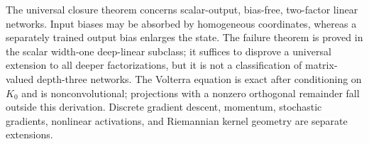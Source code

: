 The universal closure theorem concerns scalar-output, bias-free, two-factor linear networks.  Input biases may be absorbed by homogeneous coordinates, whereas a separately trained output bias enlarges the state.  The failure theorem is proved in the scalar width-one deep-linear subclass; it suffices to disprove a universal extension to all deeper factorizations, but it is not a classification of matrix-valued depth-three networks.  The Volterra equation is exact after conditioning on $K_0$ and is nonconvolutional; projections with a nonzero orthogonal remainder fall outside this derivation.  Discrete gradient descent, momentum, stochastic gradients, nonlinear activations, and Riemannian kernel geometry are separate extensions.
